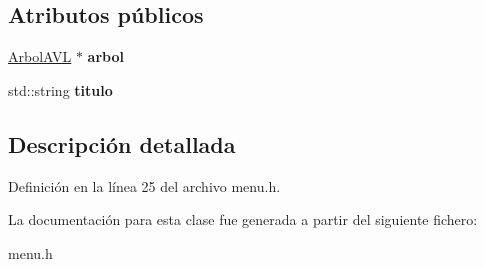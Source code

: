 \subsection*{Atributos públicos}
\begin{DoxyCompactItemize}
\item 
\mbox{\label{classMenu_a0b2445d309a32befdc877e64f555a024}} 
\hyperlink{classArbolAVL}{Arbol\+A\+VL} $\ast$ {\bfseries arbol}
\item 
\mbox{\label{classMenu_a16f1a749e7d6f35d9c1b4b7ae93b204f}} 
std\+::string {\bfseries titulo}
\end{DoxyCompactItemize}


\subsection{Descripción detallada}


Definición en la línea 25 del archivo menu.\+h.



La documentación para esta clase fue generada a partir del siguiente fichero\+:\begin{DoxyCompactItemize}
\item 
menu.\+h\end{DoxyCompactItemize}

